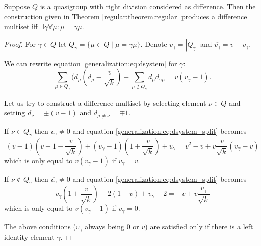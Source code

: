 \begin{theorem}
        \label{generalization:theorem:regular}
        Suppose $Q$ is a quasigroup with right division considered as difference. Then the construction given in Theorem \ref{regular:theorem:regular} produces a difference multiset iff $\exists \gamma \forall \mu \colon \mu=\gamma\mu$.
    \end{theorem}
    
    \begin{proof}
        For $\gamma \in Q$ let $Q_\gamma=\{\mu\in Q\mid \mu=\gamma\mu\}$.
        Denote $v_\gamma = |Q_\gamma|$ and $\overline{v_\gamma} = v - v_\gamma$.
        
        We can rewrite equation \eqref{generalization:eq:dsystem} for $\gamma$:
        \begin{equation}
            \label{generalization:eq:dsystem_split}
            \sum\limits_{\mu \in Q_\gamma} (d_\mu (d_\mu-\frac v {\sqrt k})
            + \sum\limits_{\mu \notin Q_\gamma} d_\mu d_{\gamma\mu}
             = v(v_\gamma - 1).
        \end{equation}

        Let us try to construct a difference multiset by selecting element $\nu \in Q$ and setting $d_\nu=\pm(v-1)$ and $d_{\mu\neq\nu}=\mp 1$.
        
        If $\nu \in Q_\gamma$ then $v_\gamma \neq 0$ and equation \eqref{generalization:eq:dsystem_split} becomes
        \begin{equation}
            (v-1)(v-1-\frac v {\sqrt k}) 
             + (v_\gamma - 1)(1 + \frac v {\sqrt k})
             + \overline{v_\gamma}
            = v^2 - v + v \frac v {\sqrt k} (v_\gamma-v)
        \end{equation}
        which is only equal to $v(v_\gamma - 1)$ if $v_\gamma=v$.
        
        If $\nu \notin Q_\gamma$ then $\overline{v_\gamma} \neq 0$ and equation \eqref{generalization:eq:dsystem_split} becomes
        \begin{equation}
            v_\gamma (1 + \frac v {\sqrt k})
             + 2 (1 - v)
             + \overline{v_\gamma} - 2
            = -v + v \frac {v_\gamma} {\sqrt k}
        \end{equation}
        which is only equal to $v(v_\gamma - 1)$ if $v_\gamma=0$.
        
        The above conditions ($v_\gamma$ always being $0$ or $v$) are satisfied only if there is a left identity element $\gamma$.
    \end{proof}

